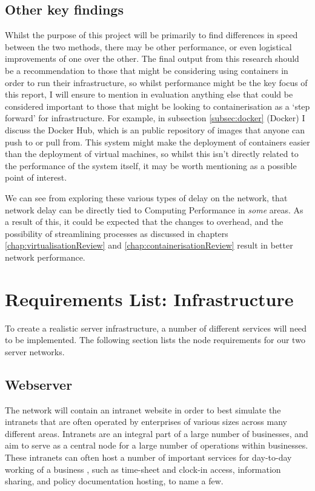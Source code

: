 \subsection{Other key findings}
Whilst the purpose of this project will be primarily to find differences in speed between the two methods, there may be other performance, or even logistical improvements of one over the other. The final output from this research should be a recommendation to those that might be considering using containers in order to run their infrastructure, so whilst performance might be the key focus of this report, I will ensure to mention in evaluation anything else that could be considered important to those that might be looking to containerisation as a `step forward' for infrastructure. For example, in subsection \ref{subsec:docker} (Docker) I discuss the Docker Hub, which is an public repository of images that anyone can push to or pull from. This system might make the deployment of containers easier than the deployment of virtual machines, so whilst this isn't directly related to the performance of the system itself, it may be worth mentioning as a possible point of interest.


We can see from exploring these various types of delay on the network, that network delay can be directly tied to Computing Performance in \emph{some} areas. As a result of this, it could be expected that the changes to overhead, and the possibility of streamlining processes as discussed in chapters \ref{chap:virtualisationReview} and \ref{chap:containerisationReview} result in better network performance.

\section{Requirements List: Infrastructure}
\label{Requirements:infrastructure}
To create a realistic server infrastructure, a number of different services will need to be implemented. The following section lists the node requirements for our two server networks.

\subsection{Webserver}
\label{subsec:webserver}
The network will contain an intranet website in order to best simulate the intranets that are often operated by enterprises of various sizes across many different areas. Intranets are an integral part of a large number of businesses, and aim to serve as a central node for a large number of operations within businesses. These intranets can often host a number of important services for day-to-day working of a business \citep{jacoby2005critical}, such as time-sheet and clock-in access, information sharing, and policy documentation hosting, to name a few.

